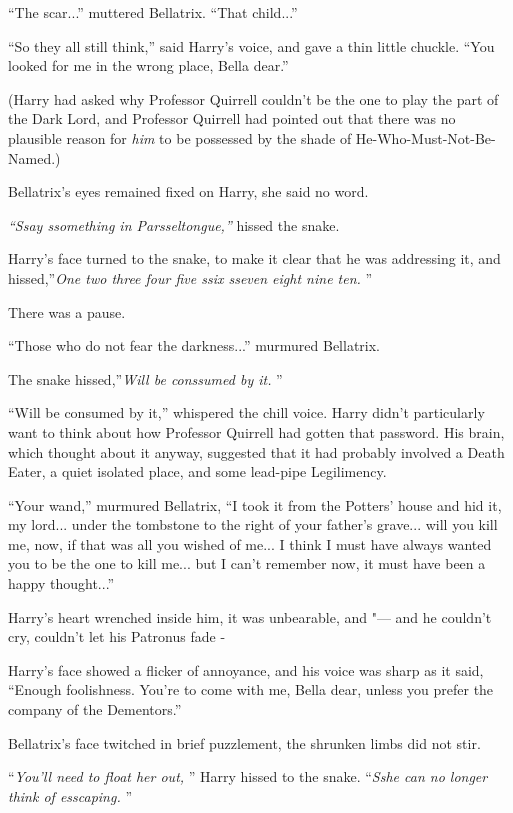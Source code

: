 ``The scar...'' muttered Bellatrix. ``That child...''

``So they all still think,'' said Harry's voice, and gave a thin little
chuckle. ``You looked for me in the wrong place, Bella dear.''

(Harry had asked why Professor Quirrell couldn't be the one to play the
part of the Dark Lord, and Professor Quirrell had pointed out that there
was no plausible reason for \emph{him} to be possessed by the shade of
He-Who-Must-Not-Be-Named.)

Bellatrix's eyes remained fixed on Harry, she said no word.

\emph{``Ssay ssomething in Parsseltongue,''} hissed the snake.

Harry's face turned to the snake, to make it clear that he was
addressing it, and hissed,''\emph{One two three four five ssix sseven
eight nine ten.} ''

There was a pause.

``Those who do not fear the darkness...'' murmured Bellatrix.

The snake hissed,''\emph{Will be conssumed by it.} ''

``Will be consumed by it,'' whispered the chill voice. Harry didn't
particularly want to think about how Professor Quirrell had gotten that
password. His brain, which thought about it anyway, suggested that it
had probably involved a Death Eater, a quiet isolated place, and some
lead-pipe Legilimency.

``Your wand,'' murmured Bellatrix, ``I took it from the Potters' house
and hid it, my lord... under the tombstone to the right of your
father's grave... will you kill me, now, if that was all you wished
of me... I think I must have always wanted you to be the one to
kill me... but I can't remember now, it must have been a happy
thought...''

Harry's heart wrenched inside him, it was unbearable, and "--- and he
couldn't cry, couldn't let his Patronus fade -

Harry's face showed a flicker of annoyance, and his voice was sharp as
it said, ``Enough foolishness. You're to come with me, Bella dear,
unless you prefer the company of the Dementors.''

Bellatrix's face twitched in brief puzzlement, the shrunken limbs did
not stir.

``\emph{You'll need to float her out,} '' Harry hissed to the snake.
``\emph{Sshe can no longer think of esscaping.} ''

